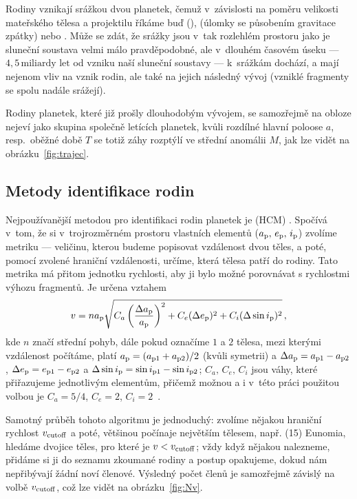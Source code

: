 \documentclass[A4paper, 12pt, oneside]{book}
\begin{document}
Rodiny vznikají srážkou dvou planetek, čemuž v~závislosti na poměru velikosti mateřského tělesa a projektilu říkáme buď  (),  (úlomky se působením gravitace  zpátky) nebo . Může se zdát, že srážky jsou v~tak rozlehlém prostoru jako je sluneční soustava velmi málo pravděpodobné, ale v~dlouhém časovém úseku --- $4,5\,\text{miliardy let}$ od vzniku naší sluneční soustavy --- k~srážkám dochází, a mají nejenom vliv na vznik rodin, ale také na jejich následný vývoj (vzniklé fragmenty se spolu nadále srážejí).

Rodiny planetek, které již prošly dlouhodobým vývojem, se samozřejmě na obloze nejeví jako skupina společně letících planetek, kvůli rozdílné hlavní poloose $a$, resp.\ oběžné době $T$ se totiž záhy rozptýlí ve střední anomálii $M$, jak lze vidět na obrázku~\ref{fig:trajec}.

\subsection{Metody identifikace rodin} \label{sec:metodyiden}
Nejpoužívanější metodou pro identifikaci rodin planetek je  (HCM) \cite{zappala90}. Spočívá v~tom, že si v~trojrozměrném prostoru vlastních elementů ($a_{\rm p},\,e_{\rm p},\,i_{\rm p}$) zvolíme metriku --- veličinu, kterou budeme popisovat vzdálenost dvou těles, a poté, pomocí zvolené hraniční  vzdálenosti, určíme, která tělesa patří do rodiny. Tato metrika má přitom jednotku rychlosti, aby ji bylo možné porovnávat s rychlostmi výhozu fragmentů. Je určena vztahem
\begin{align}
	v=na_{\rm p}\sqrt{C_a\left(\frac{\Delta a_{\rm p}}{a_{\rm p}}\right)^2+C_e(\Delta e_{\rm p})^2+C_i(\Delta \sin i_{\rm p})^2}\,,
\end{align}
kde $n$ značí střední pohyb, dále pokud označíme $1$ a $2$ tělesa, mezi kterými vzdálenost počítáme, platí $a_{\rm p}=(a_{{\rm p}1}+a_{{\rm p}2})/2$ (kvůli symetrii) a $\Delta a_{\rm p}=a_{{\rm p}1}-a_{{\rm p}2}$, $\Delta e_{\rm p}=e_{{\rm p}1}-e_{{\rm p}2}$ a $\Delta \sin i_{\rm p}=\sin i_{{\rm p}1}-\sin i_{{\rm p}2}$; $C_a,\,C_e,\,C_i$ jsou váhy, které přiřazujeme jednotlivým elementům, přičemž možnou a i v~této práci použitou volbou je $C_a=5/4$, $C_e=2$, $C_i=2$~\cite{zappala90}. 

Samotný průběh tohoto algoritmu je jednoduchý: zvolíme nějakou hraniční rychlost $v_{\rm cutoff}$ a poté, většinou počínaje největším tělesem, např. (15) Eunomia, hledáme dvojice těles, pro které je $v<v_{\rm cutoff}$; vždy když nějakou nalezneme, přidáme si ji do seznamu zkoumané rodiny a postup opakujeme, dokud nám nepřibývají žádní noví členové. Výsledný počet členů je samozřejmě závislý na volbě $v_{\rm cutoff}$, což lze vidět na obrázku~\ref{fig:Nv}.
\end{document}
